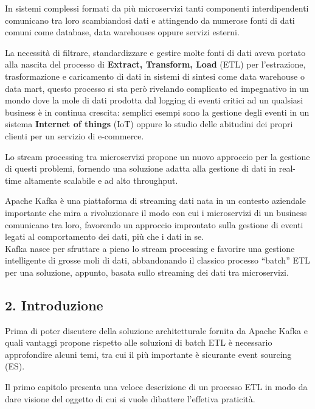 \documentclass[]{article}
\begin{document}
In sistemi complessi formati da più microservizi tanti componenti
interdipendenti comunicano tra loro scambiandosi dati e attingendo da
numerose fonti di dati comuni come database, data warehouses oppure
servizi esterni.

La necessità di filtrare, standardizzare e gestire molte fonti di dati
aveva portato alla nascita del processo di \textbf{Extract, Transform,
Load} (ETL) per l'estrazione, trasformazione e caricamento di dati in
sistemi di sintesi come data warehouse o data mart, questo processo si
sta però rivelando complicato ed impegnativo in un mondo dove la mole di
dati prodotta dal logging di eventi critici ad un qualsiasi business è
in continua crescita: semplici esempi sono la gestione degli eventi in
un sistema \textbf{Internet of things} (IoT) oppure lo studio delle
abitudini dei propri clienti per un servizio di e-commerce.

Lo stream processing tra microservizi propone un nuovo approccio per la
gestione di questi problemi, fornendo una soluzione adatta alla gestione
di dati in real-time altamente scalabile e ad alto throughput.

Apache Kafka è una piattaforma di streaming dati nata in un contesto
aziendale importante che mira a rivoluzionare il modo con cui i
microservizi di un business comunicano tra loro, favorendo un approccio
improntato sulla gestione di eventi legati al comportamento dei dati,
più che i dati in se.\\
Kafka nasce per sfruttare a pieno lo stream processing e favorire una
gestione intelligente di grosse moli di dati, abbandonando il classico
processo ``batch'' ETL per una soluzione, appunto, basata sullo
streaming dei dati tra microservizi.

\newpage

\hypertarget{introduzione}{\subsection{2.
Introduzione}\label{introduzione}}

Prima di poter discutere della soluzione architetturale fornita da
Apache Kafka e quali vantaggi propone rispetto alle soluzioni di batch
ETL è necessario approfondire alcuni temi, tra cui il più importante è
sicurante event sourcing (ES).

Il primo capitolo presenta una veloce descrizione di un processo ETL in
modo da dare visione del oggetto di cui si vuole dibattere l'effetiva
praticità.
\end{document}
